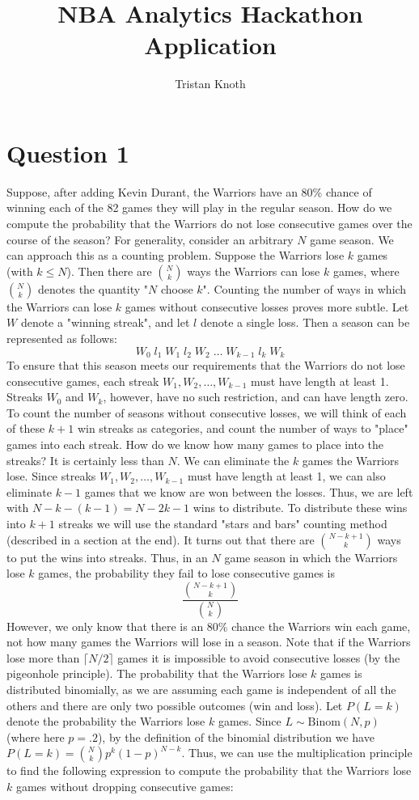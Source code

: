 \documentclass{article}
\title{NBA Analytics Hackathon Application}
\author{Tristan Knoth}
\begin{document}
\maketitle
\section*{Question 1}
Suppose, after adding Kevin Durant, the Warriors have an 80\% chance of winning each of the 82 games they will play in the regular season. How do we compute the probability that the Warriors do not lose consecutive games over the course of the season? For generality, consider an arbitrary $N$ game season. We can approach this as a counting problem. Suppose the Warriors lose $k$ games (with $k \leq N$). Then there are $\binom{N}{k}$ ways the Warriors can lose $k$ games, where $\binom{N}{k}$ denotes the quantity "$N$ choose $k$". Counting the number of ways in which the Warriors can lose $k$ games without consecutive losses proves more subtle. Let $W$ denote a "winning streak", and let $l$ denote a single loss. Then a season can be represented as follows:
\[ W_0\; l_1 \; W_1 \; l_2 \; W_2 \; \ldots \; W_{k-1} \; l_k \; W_k \]
To ensure that this season meets our requirements that the Warriors do not lose consecutive games, each streak $W_1,W_2,\ldots,W_{k-1}$ must have length at least 1. Streaks $W_0$ and $W_k$, however, have no such restriction, and can have length zero. To count the number of seasons without consecutive losses, we will think of each of these $k+1$ win streaks as categories, and count the number of ways to "place" games into each streak. How do we know how many games to place into the streaks? It is certainly less than $N$. We can eliminate the $k$ games the Warriors lose. Since streaks $W_1,W_2,\ldots,W_{k-1}$ must have length at least 1, we can also eliminate $k-1$ games that we know are won between the losses. Thus, we are left with $N-k-(k-1) = N-2k-1$ wins to distribute. To distribute these wins into $k+1$ streaks we will use the standard "stars and bars" counting method (described in a section at the end). It turns out that there are $\binom{N-k+1}{k}$ ways to put the wins into streaks. Thus, in an $N$ game season in which the Warriors lose $k$ games, the probability they fail to lose consecutive games is
\[ \frac{\binom{N-k+1}{k}}{\binom{N}{k}}\]
However, we only know that there is an 80\% chance the Warriors win each game, not how many games the Warriors will lose in a season. Note that if the Warriors lose more than $\lceil N/2 \rceil$ games it is impossible to avoid consecutive losses (by the pigeonhole principle). The probability that the Warriors lose $k$ games is distributed binomially, as we are assuming each game is independent of all the others and there are only two possible outcomes (win and loss). Let $P(L=k)$ denote the probability the Warriors lose $k$ games. Since $L \sim \text{Binom} (N,p)$ (where here $p = .2$), by the definition of the binomial distribution we have $P(L=k) = \binom{N}{k} p^k (1-p)^{N-k}$. Thus, we can use the multiplication principle to find the following expression to compute the probability that the Warriors lose $k$ games without dropping consecutive games:
\end{document}
